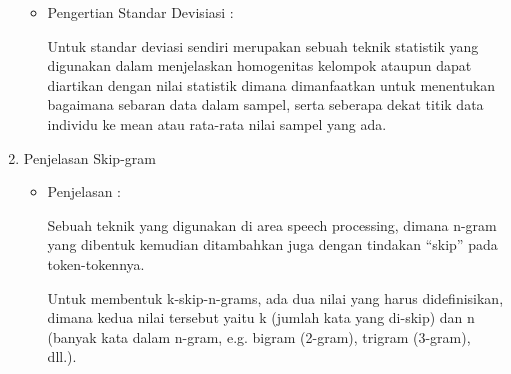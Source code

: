 \begin{enumerate}
\begin{itemize}
\item  Pengertian Standar Devisiasi :
\par Untuk standar deviasi sendiri merupakan sebuah teknik statistik yang digunakan dalam menjelaskan homogenitas kelompok ataupun dapat diartikan dengan nilai statistik dimana dimanfaatkan untuk menentukan bagaimana sebaran data dalam sampel, serta seberapa dekat titik data individu ke mean atau rata-rata nilai sampel yang ada. 
\end{itemize}
\item Penjelasan Skip-gram
\begin{itemize}
\item  Penjelasan :
\par Sebuah  teknik yang digunakan di area speech processing, dimana n-gram yang dibentuk kemudian ditambahkan juga dengan tindakan “skip” pada token-tokennya. 
\par Untuk membentuk k-skip-n-grams, ada dua nilai yang harus didefinisikan, dimana kedua nilai tersebut yaitu k (jumlah kata yang di-skip) dan n (banyak kata dalam n-gram, e.g. bigram (2-gram), trigram (3-gram), dll.).
\end{itemize}

\end{enumerate}